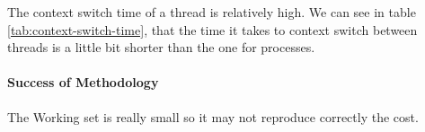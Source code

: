 The context switch time of a thread is relatively high.
We can see in table \ref{tab:context-switch-time}, that the
time it takes to context switch between threads is a little bit shorter
than the one for processes.

\paragraph{Success of Methodology}
The Working set is really small so it may not reproduce correctly the cost.


